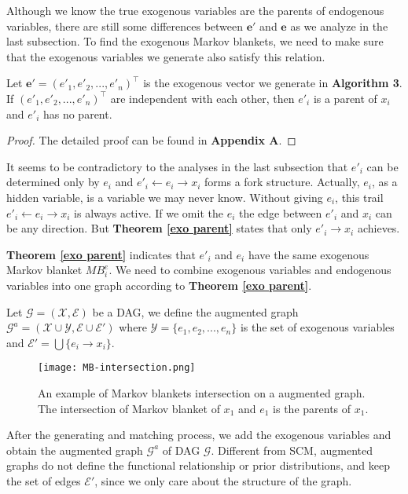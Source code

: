 \documentclass[twoside,11pt]{article}
\begin{document}
Although we know the true exogenous variables are the parents of endogenous variables, there are still some differences between $\mathbf e'$ and $\mathbf e$ as we analyze in the last subsection. To find the exogenous Markov blankets, we need to make sure that the exogenous variables we generate also satisfy this relation.
\begin{theorem}
\label{exo parent}
Let $\mathbf e'=(e'_1, e'_2, ..., e'_n)^\top$ is the exogenous vector we generate in \textbf{Algorithm 3}. If $(e'_1, e'_2, ..., e'_n)^\top$ are independent with each other, then $e'_i$ is a parent of $x_i$ and $e'_i$ has no parent.
\end{theorem}
\begin{proof}
    The detailed proof can be found in \textbf{Appendix A}.
\end{proof}
It seems to be contradictory to the analyses in the last subsection that $e'_i$ can be determined only by $e_i$ and $e'_i\gets e_i\to x_i$ forms a fork structure. Actually, $e_i$, as a hidden variable, is a variable we may never know. Without giving $e_i$, this trail $e'_i\gets e_i\to x_i$ is always active. If we omit the $e_i$ the edge between $e'_i$ and $x_i$ can be any direction. But \textbf{Theorem \ref{exo parent}} states that only $e'_i\to x_i$ achieves.

\textbf{Theorem \ref{exo parent}} indicates that $e'_i$ and $e_i$ have the same exogenous Markov blanket $MB^e_i$. We need to combine exogenous variables and endogenous variables into one graph according to \textbf{Theorem \ref{exo parent}}. 
\begin{definition}
Let $\mathcal G=(\mathcal X, \mathcal E)$ be a DAG, we define the augmented graph $\mathcal G^a=(\mathcal X\cup\mathcal Y, \mathcal E\cup\mathcal E')$ where $\mathcal Y=\{e_1, e_2, ..., e_n\}$ is the set of exogenous variables and $\mathcal E'=\bigcup\{e_i\to x_i\}$.
\end{definition}

\begin{figure}
\centering
\texttt{[image: MB-intersection.png]}
\caption{An example of Markov blankets intersection on a augmented graph. The intersection of Markov blanket of $x_1$ and $e_1$ is the parents of $x_1$.}\label{MB-intersection}
\end{figure}

After the generating and matching process, we add the exogenous variables and obtain the augmented graph $\mathcal G^a$ of DAG $\mathcal G$.
Different from SCM, augmented graphs do not define the functional relationship or prior distributions, and keep the set of edges $\mathcal E'$, since we only care about the structure of the graph. 
\end{document}
